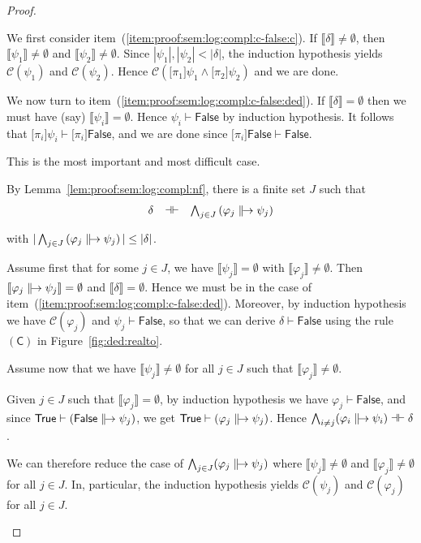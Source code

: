 \documentclass[%
  a4paper,
  UKenglish,
  cleveref,
  autoref,
  thm-restate,
  numberwithinsect,
]{lipics-v2021}
\newcommand\thesis{\vdash}
\newcommand\defthesisiff{\dashv\vdash}
\newcommand\thesisiff{\mathrel{\defthesisiff}}
\newcommand\I[1]{\llbracket #1 \rrbracket} %
\newcommand\ax[1]{(\mathsf{#1})}
\newcommand\C{\mathcal{C}}		%
\newcommand\temp[1]{\mathsf{#1}}
\newcommand\True{\temp{True}}
\newcommand\False{\temp{False}}
\newcommand\arrow\to
\newcommand\defrealto{\mathrel\parallel\joinrel\to}
\newcommand\realto{\mathrel{\defrealto}}
\newcommand\PT{\tau}		%
\newcommand\PTbis{\sigma}	%
\newcommand\form[1]{\lbrack #1 \rbrack}
\begin{document}
\begin{proof}
\begin{description}
We first consider item~(\ref{item:proof:sem:log:compl:c-false:c}).
If $\I\delta \neq \emptyset$,
then $\I{\psi_1} \neq \emptyset$
and $\I{\psi_2} \neq \emptyset$.
Since $|\psi_1|, |\psi_2| < |\delta|$,
the induction hypothesis yields
$\C(\psi_1)$ and $\C(\psi_2)$.
Hence
$\C(\form{\pi_1}\psi_1 \land \form{\pi_2}\psi_2)$
and we are done.

We now turn to item~(\ref{item:proof:sem:log:compl:c-false:ded}).
If $\I\delta = \emptyset$ then we must have (say)
$\I{\psi_i} = \emptyset$.
Hence $\psi_i \thesis \False$ by induction hypothesis.
It follows that
$\form{\pi_i}\psi_i \thesis \form{\pi_i}\False$,
and we are done since
$\form{\pi_i}\False \thesis \False$.

\item[Case of $\PTbis \arrow \PT$.]
This is the most important and most difficult case.

By Lemma~\ref{lem:proof:sem:log:compl:nf},
there is a finite set $J$ such that
\[
\begin{array}{l l l}
  \delta
& \thesisiff
& \bigwedge_{j \in J} \left(\varphi_j \realto \psi_j\right)
\end{array}
\]

\noindent
with
\(
  |\bigwedge_{j \in J} \left(\varphi_j \realto \psi_j\right)|
  \leq
  |\delta|
\).

Assume first that for some $j \in J$,
we have $\I{\psi_j} = \emptyset$
with $\I{\varphi_j} \neq \emptyset$.
Then $\I{\varphi_j \realto \psi_j} = \emptyset$
and $\I\delta = \emptyset$.
Hence we must be in the case of item~(\ref{item:proof:sem:log:compl:c-false:ded}).
Moreover, by induction hypothesis we have $\C(\varphi_j)$
and $\psi_j \thesis \False$,
so that we can derive $\delta \thesis \False$ using the rule $\ax{C}$
in Figure~\ref{fig:ded:realto}.


Assume now that we have $\I{\psi_j} \neq \emptyset$
for all $j \in J$ such that $\I{\varphi_j} \neq \emptyset$.

Given $j \in J$ such that $\I{\varphi_j} = \emptyset$,
by induction hypothesis we have $\varphi_j \thesis \False$,
and since $\True \thesis \left( \False \realto \psi_j \right)$,
we get $\True \thesis \left(\varphi_j \realto \psi_j \right)$.
Hence
$\bigwedge_{i \neq j}(\varphi_i \realto \psi_i) \thesisiff \delta$.

We can therefore reduce the case of 
$\bigwedge_{j \in J} (\varphi_j \realto \psi_j)$
where 
$\I{\psi_j} \neq \emptyset$ and $\I{\varphi_j} \neq \emptyset$
for all $j \in J$.
In, particular, the induction hypothesis yields $\C(\psi_j)$
and $\C(\varphi_j)$ for all $j \in J$.



\end{description}
\end{proof}
\end{document}
